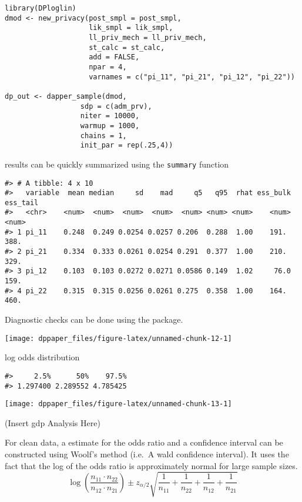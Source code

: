 \begin{verbatim}
library(DPloglin)
dmod <- new_privacy(post_smpl = post_smpl,
                    lik_smpl = lik_smpl,
                    ll_priv_mech = ll_priv_mech,
                    st_calc = st_calc,
                    add = FALSE,
                    npar = 4,
                    varnames = c("pi_11", "pi_21", "pi_12", "pi_22"))
                  
dp_out <- dapper_sample(dmod,
                  sdp = c(adm_prv),
                  niter = 10000,
                  warmup = 1000,
                  chains = 1,
                  init_par = rep(.25,4))
\end{verbatim}

results can be quickly summarized using the \texttt{summary} function

\begin{verbatim}
#> # A tibble: 4 x 10
#>   variable  mean median     sd    mad     q5   q95  rhat ess_bulk ess_tail
#>   <chr>    <num>  <num>  <num>  <num>  <num> <num> <num>    <num>    <num>
#> 1 pi_11    0.248  0.249 0.0254 0.0257 0.206  0.288  1.00    191.      388.
#> 2 pi_21    0.334  0.333 0.0261 0.0254 0.291  0.377  1.00    210.      329.
#> 3 pi_12    0.103  0.103 0.0272 0.0271 0.0586 0.149  1.02     76.0     159.
#> 4 pi_22    0.315  0.315 0.0256 0.0261 0.275  0.358  1.00    164.      460.
\end{verbatim}

Diagnostic checks can be done using the  package.

\begin{center}\texttt{[image: dppaper\_files/figure-latex/unnamed-chunk-12-1]} \end{center}

log odds distribution

\begin{verbatim}
#>     2.5%      50%    97.5% 
#> 1.297400 2.289552 4.785425
\end{verbatim}

\begin{center}\texttt{[image: dppaper\_files/figure-latex/unnamed-chunk-13-1]} \end{center}

(Insert gdp Analysis Here)

For clean data, a estimate for the odds ratio and a confidence interval
can be constructed using Woolf's method (i.e.~A wald confidence interval).
It uses the fact that the log of the odds ratio is approximately
normal for large sample sizes.
\[
\log\left(\dfrac{n_{11} \cdot n_{22}}{n_{12} \cdot n_{21}}\right) 
  \pm z_{\alpha/2}\sqrt{\dfrac{1}{n_{11}} + \dfrac{1}{n_{22}} + \dfrac{1}{n_{12}} + \dfrac{1}{n_{21}}}
\]

